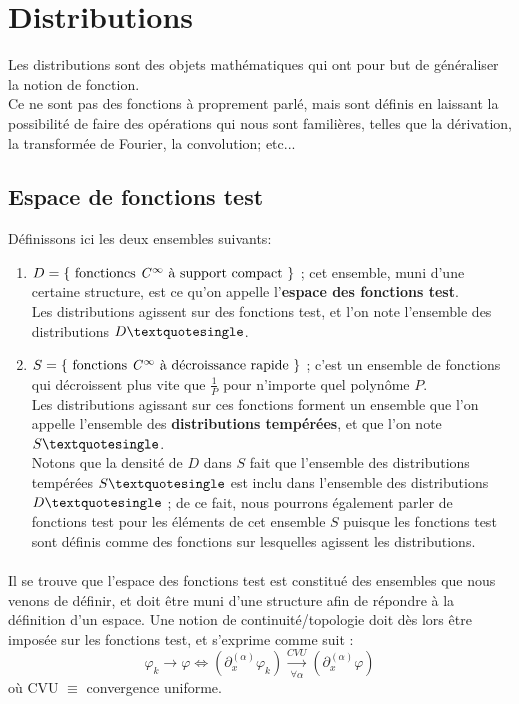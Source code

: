 \documentclass[../notesdecours.tex]{subfiles}
\begin{document}
\section{Distributions}
Les distributions sont des objets mathématiques qui ont pour but de généraliser la notion de fonction. \\
Ce ne sont pas des fonctions à proprement parlé, mais sont définis en laissant la possibilité de faire des opérations
qui nous sont familières, telles que la dérivation, la transformée de Fourier, la convolution; etc... \\

\subsection{Espace de fonctions test}

Définissons ici les deux ensembles suivants: 
\begin{enumerate}
    \item $D = \left\{ \mbox{ fonctioncs \textit{C}$^{\infty}$ à support compact } \right\}$ ; cet ensemble, muni d'une certaine structure, est ce qu'on appelle l'\textbf{espace des fonctions test}.\\ 
    Les distributions agissent sur des fonctions test, et l'on note l'ensemble des distributions $D \textquotesingle$. \\
    \item $S = \left\{ \mbox{ fonctions \textit{C}$^{\infty}$ à décroissance rapide } \right\}$ ; c'est un ensemble de fonctions qui décroissent plus vite que $\frac{1}{P}$ pour n'importe quel polynôme $P$. \\
    Les distributions agissant sur ces fonctions forment un ensemble que l'on appelle l'ensemble des \textbf{distributions tempérées}, et que l'on note $S \textquotesingle$. \\
    Notons que la densité de $D$ dans $S$ fait que l'ensemble des distributions tempérées $S \textquotesingle$ est inclu dans l'ensemble des distributions $D \textquotesingle$ ;
    de ce fait, nous pourrons également parler de fonctions test pour les éléments de cet ensemble $S$ puisque les fonctions test sont définis comme des fonctions sur lesquelles agissent les distributions. 
\end{enumerate}

\paragraph{} Il se trouve que l'espace des fonctions test est constitué des ensembles que nous venons de définir, 
et doit être muni d'une structure afin de répondre à la définition d'un espace. 
Une notion de continuité/topologie doit dès lors être imposée sur les fonctions test, et s'exprime comme suit :
\begin{equation}
\varphi_k \rightarrow \varphi \iff (\partial_x^{(\alpha)} \varphi_k) \xrightarrow[\forall \alpha]{CVU} (\partial_x^{(\alpha)}\varphi)
\end{equation}
où CVU $\equiv$ convergence uniforme.
\end{document}
